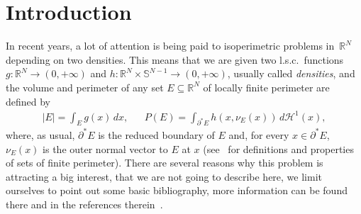 \documentclass[JEP,XML,SOM,Unicode,NoFloatCountersInSection]{cedram}
\newcommand\R{\mathbb{R}}
\renewcommand\S{\mathbb{S}}
\renewcommand\H{\mathcal{H}}
\theoremstyle{plain}
\theoremstyle{definition}
\begin{document}
\maketitle
\tableofcontents
\mainmatter

\section{Introduction}

In recent years, a lot of attention is being paid to isoperimetric problems in~$\R^N$ depending on two densities. This means that we are given two l.s.c.\ functions \hbox{$g:\R^N\to (0,+\infty)$} and $h:\R^N\times\S^{N-1}\to (0,+\infty)$, usually called \emph{densities}, and the volume and perimeter of any set $E\subseteq\R^N$ of locally finite perimeter are defined by
\begin{align}\label{weightedvolper}
|E| = \int_E g(x)\,dx, && P(E) = \int_{\partial^* E} h(x,\nu_E(x))\, d\H^1(x),
\end{align}
where, as usual, $\partial^* E$ is the reduced boundary of $E$ and, for every $x\in\partial^* E$, $\nu_E(x)$ is the outer normal vector to $E$ at $x$ (see~\cite{AFP} for definitions and properties of sets of finite perimeter). There are several reasons why this problem is attracting a big interest, that we are not going to describe here, we limit ourselves to point out some basic bibliography, more information can be found there and in the references therein~\cite{RCBM08,CMV10,CRS12,MP13,BBCLT16,ABCMP17,DFP,G18,ABCMP19,CGPRS20,FP20}.
\end{document}
